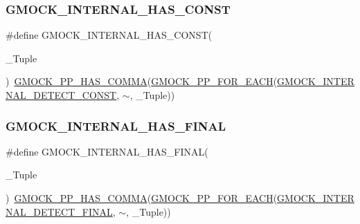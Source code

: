 \subsubsection{\texorpdfstring{GMOCK\_INTERNAL\_HAS\_CONST}{GMOCK\_INTERNAL\_HAS\_CONST}}
{\footnotesize\ttfamily \#define G\+M\+O\+C\+K\+\_\+\+I\+N\+T\+E\+R\+N\+A\+L\+\_\+\+H\+A\+S\+\_\+\+C\+O\+N\+ST(\begin{DoxyParamCaption}\item[{}]{\+\_\+\+Tuple }\end{DoxyParamCaption})~\mbox{\hyperlink{_obj__test_2lib_2googletest-master_2googlemock_2include_2gmock_2internal_2gmock-pp_8h_aaf83e01e56eb26d7eac9efb477587510}{G\+M\+O\+C\+K\+\_\+\+P\+P\+\_\+\+H\+A\+S\+\_\+\+C\+O\+M\+MA}}(\mbox{\hyperlink{_obj__test_2lib_2googletest-master_2googlemock_2include_2gmock_2internal_2gmock-pp_8h_abc9368d9b0960531e3cfb9e5d6a41816}{G\+M\+O\+C\+K\+\_\+\+P\+P\+\_\+\+F\+O\+R\+\_\+\+E\+A\+CH}}(\mbox{\hyperlink{_obj__test_2lib_2googletest-master_2googlemock_2include_2gmock_2gmock-function-mocker_8h_a3db348fab7c9ba65b3c9f4a7c1a9b3cc}{G\+M\+O\+C\+K\+\_\+\+I\+N\+T\+E\+R\+N\+A\+L\+\_\+\+D\+E\+T\+E\+C\+T\+\_\+\+C\+O\+N\+ST}}, $\sim$, \+\_\+\+Tuple))}

\mbox{\label{_obj__test_2lib_2googletest-master_2googlemock_2include_2gmock_2gmock-function-mocker_8h_a1c4b4308770f5ff925ba9ed1bf578644}} 
\subsubsection{\texorpdfstring{GMOCK\_INTERNAL\_HAS\_FINAL}{GMOCK\_INTERNAL\_HAS\_FINAL}}
{\footnotesize\ttfamily \#define G\+M\+O\+C\+K\+\_\+\+I\+N\+T\+E\+R\+N\+A\+L\+\_\+\+H\+A\+S\+\_\+\+F\+I\+N\+AL(\begin{DoxyParamCaption}\item[{}]{\+\_\+\+Tuple }\end{DoxyParamCaption})~\mbox{\hyperlink{_obj__test_2lib_2googletest-master_2googlemock_2include_2gmock_2internal_2gmock-pp_8h_aaf83e01e56eb26d7eac9efb477587510}{G\+M\+O\+C\+K\+\_\+\+P\+P\+\_\+\+H\+A\+S\+\_\+\+C\+O\+M\+MA}}(\mbox{\hyperlink{_obj__test_2lib_2googletest-master_2googlemock_2include_2gmock_2internal_2gmock-pp_8h_abc9368d9b0960531e3cfb9e5d6a41816}{G\+M\+O\+C\+K\+\_\+\+P\+P\+\_\+\+F\+O\+R\+\_\+\+E\+A\+CH}}(\mbox{\hyperlink{_obj__test_2lib_2googletest-master_2googlemock_2include_2gmock_2gmock-function-mocker_8h_a2b0f53a8fea3a79d52582daf294737b0}{G\+M\+O\+C\+K\+\_\+\+I\+N\+T\+E\+R\+N\+A\+L\+\_\+\+D\+E\+T\+E\+C\+T\+\_\+\+F\+I\+N\+AL}}, $\sim$, \+\_\+\+Tuple))}

